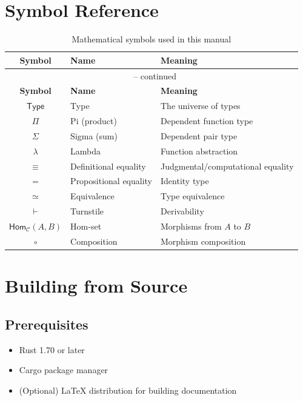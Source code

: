 \documentclass[11pt,a4paper,twoside]{report}
\newcommand{\Type}{\mathsf{Type}}
\newcommand{\Sigma}[2]{\sum_{#1} #2}
\newcommand{\Pi}[2]{\prod_{#1} #2}
\newcommand{\Hom}[3]{\mathsf{Hom}_{#1}(#2, #3)}
\newcommand{\proves}{\vdash}
\begin{document}
\appendix

\chapter{Symbol Reference}
\label{app:symbols}

\begin{longtable}{@{}clp{8cm}@{}}
\caption{Mathematical symbols used in this manual} \\
\toprule
\textbf{Symbol} & \textbf{Name} & \textbf{Meaning} \\
\midrule
\endfirsthead
\multicolumn{3}{c}{\tablename\ \thetable{} -- continued} \\
\toprule
\textbf{Symbol} & \textbf{Name} & \textbf{Meaning} \\
\midrule
\endhead
\bottomrule
\endfoot
$\Type$ & Type & The universe of types \\
$\Pi$ & Pi (product) & Dependent function type \\
$\Sigma$ & Sigma (sum) & Dependent pair type \\
$\lambda$ & Lambda & Function abstraction \\
$\equiv$ & Definitional equality & Judgmental/computational equality \\
$=$ & Propositional equality & Identity type \\
$\simeq$ & Equivalence & Type equivalence \\
$\proves$ & Turnstile & Derivability \\
$\Hom{\mathcal{C}}{A}{B}$ & Hom-set & Morphisms from $A$ to $B$ \\
$\circ$ & Composition & Morphism composition \\
\end{longtable}

\chapter{Building from Source}
\label{app:building}

\section{Prerequisites}

\begin{itemize}
    \item Rust 1.70 or later
    \item Cargo package manager
    \item (Optional) \LaTeX{} distribution for building documentation
\end{itemize}
\end{document}
